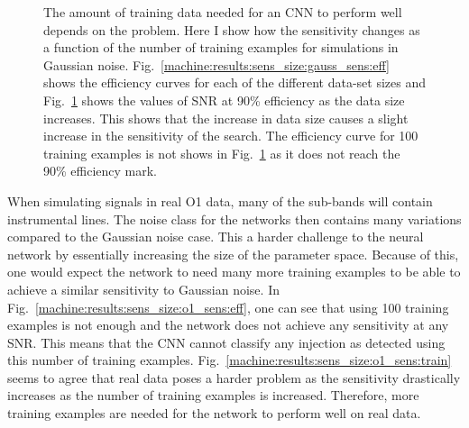 \begin{figure}[h]
\begin{subfigure}[h]{0.5\textwidth}
		\caption{}
		\label{machine:results:sens_size:gauss_sens:train}
	\end{subfigure}
	\caption[Sensitivity with size of data set for Gaussian noise simulations.]{The amount of training data needed for an \gls{CNN} to perform well depends on the problem. Here I show how the sensitivity changes as a function of the number of training examples for simulations in Gaussian noise. Fig.~\ref{machine:results:sens_size:gauss_sens:eff} shows the efficiency curves for each of the different data-set sizes and Fig.~\ref{machine:results:sens_size:gauss_sens:train} shows the values of \gls{SNR} at 90\% efficiency as the data size increases. This shows that the increase in data size causes a slight increase in the sensitivity of the search. The efficiency curve for 100 training examples is not shows in Fig.~\ref{machine:results:sens_size:gauss_sens:train} as it does not reach the 90\% efficiency mark. }
	\label{machine:results:sens_size:gauss_sens}
\end{figure}

When simulating signals in real O1 data, many of the sub-bands will contain instrumental lines. 
The noise class for the networks then contains many variations compared to the Gaussian noise case. 
This a harder challenge to the neural network by essentially increasing the size of the parameter space.
Because of this, one would expect the network to need many more training examples to be able to achieve a similar sensitivity to Gaussian noise.
In Fig.~\ref{machine:results:sens_size:o1_sens:eff}, one can see that using 100 training examples is not enough and the network does not achieve any sensitivity at any \gls{SNR}. This means that the \gls{CNN} cannot classify any injection as detected using this number of training examples.
Fig.~\ref{machine:results:sens_size:o1_sens:train} seems to agree that real data poses a harder problem as the sensitivity drastically increases as the number of training examples is increased.
Therefore, more training examples are needed for the network to perform well on real data.

